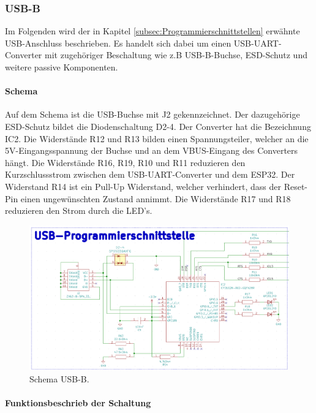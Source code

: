 \subsubsection{USB-B}\label{subsubsec:USB-B}

Im Folgenden wird der in Kapitel \ref{subsec:Programmierschnittstellen} erwähnte USB-Anschluss beschrieben. Es handelt sich dabei um einen USB-UART-Converter mit zugehöriger Beschaltung wie z.B USB-B-Buchse, ESD-Schutz und weitere passive Komponenten.

\paragraph{Schema}\mbox{}

Auf dem Schema ist die USB-Buchse mit J2 gekennzeichnet. Der dazugehörige ESD-Schutz bildet die Diodenschaltung D2-4. Der Converter hat die Bezeichnung IC2. Die Widerstände R12 und R13 bilden einen Spannungsteiler, welcher an die 5V-Eingangsspannung der Buchse und an dem VBUS-Eingang des Converters hängt. Die Widerstände R16, R19, R10 und R11 reduzieren den Kurzschlussstrom zwischen dem USB-UART-Converter und dem ESP32. Der Widerstand R14 ist ein Pull-Up Widerstand, welcher verhindert, dass der Reset-Pin einen ungewünschten Zustand annimmt. Die Widerstände R17 und R18 reduzieren den Strom durch die LED's.

\begin{figure}[h!]
	\centering
	\includegraphics[width=1\textwidth]{graphics/Schema_USB_B}
	\caption{Schema USB-B.}
	\label{fig:Schema_USB_B}
\end{figure}
\newpage
\paragraph{Funktionsbeschrieb der Schaltung}\mbox{}


